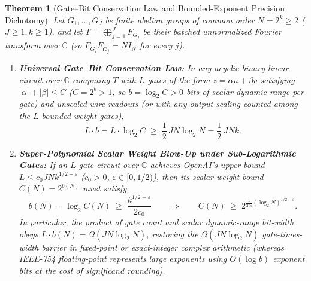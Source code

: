 \documentclass[11pt,a4paper]{article}
\newtheorem{theorem}{Theorem}[section]
\theoremstyle{definition}
\theoremstyle{remark}
\newcommand{\CC}{\mathbb{C}}
\begin{document}
\begin{theorem}[Gate--Bit Conservation Law and Bounded-Exponent Precision Dichotomy]\label{thm:conservation}
Let $G_1,\dots,G_J$ be finite abelian groups of common order $N = 2^k \ge 2$ ($J \ge 1, k \ge 1$), and let $T = \bigoplus_{j=1}^J F_{G_j}$ be their batched unnormalized Fourier transform over $\CC$ (so $F_{G_j} F_{G_j}^\dagger = N I_N$ for every $j$).
\begin{enumerate}[leftmargin=1.8em,itemsep=2pt]
  \item \textbf{Universal Gate--Bit Conservation Law:} In any acyclic binary linear circuit over $\CC$ computing $T$ with $L$ gates of the form $z = \alpha u + \beta v$ satisfying $|\alpha| + |\beta| \le C$ ($C = 2^b > 1$, so $b = \log_2 C > 0$ bits of scalar dynamic range per gate) and unscaled wire readouts (or with any output scaling counted among the $L$ bounded-weight gates),
  \begin{equation}\label{eq:conservation}
    L \cdot b = L \cdot \log_2 C \;\ge\; \frac{1}{2}\, J N \log_2 N = \frac{1}{2}\, J N k.
  \end{equation}
  \item \textbf{Super-Polynomial Scalar Weight Blow-Up under Sub-Logarithmic Gates:} If an $L$-gate circuit over $\CC$ achieves OpenAI's upper bound $L \le c_0 J N k^{1/2 + \varepsilon}$ ($c_0 > 0$, $\varepsilon \in [0, 1/2)$), then its scalar weight bound $C(N) = 2^{b(N)}$ must satisfy
  \begin{equation}\label{eq:blowup}
    b(N) = \log_2 C(N) \;\ge\; \frac{k^{1/2 - \varepsilon}}{2 c_0}
    \qquad\Longrightarrow\qquad
    C(N) \;\ge\; 2^{\frac{1}{2 c_0}(\log_2 N)^{1/2 - \varepsilon}}.
  \end{equation}
  In particular, the product of gate count and scalar dynamic-range bit-width obeys $L \cdot b(N) = \Omega(J N \log_2 N)$, restoring the $\Omega(JN\log_2 N)$ gate-times-width barrier in fixed-point or exact-integer complex arithmetic (whereas IEEE-754 floating-point represents large exponents using $O(\log b)$ exponent bits at the cost of significand rounding).

\end{enumerate}
\end{theorem}
\end{document}
